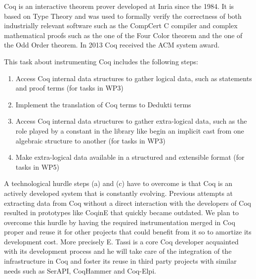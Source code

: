 
Coq is an interactive theorem prover developed at Inria since the 1984.
It is based on Type Theory and was used to formally verify the correctness
of both industrially relevant software such as the CompCert C compiler and
complex mathematical proofs such as the one of the Four Color theorem and the
one of the Odd Order theorem. In 2013 Coq received the ACM system award.

This task about instrumenting Coq includes the following steps:
\begin{enumerate}
\item Access Coq internal data structures to gather logical data, such as
statements and proof terms (for tasks in WP3)
\item Implement the translation of Coq terms to Dedukti terms
\item Access Coq internal data structures to gather extra-logical data,
such as the role played by a constant in the library like begin an implicit
cast from one algebraic structure to another (for tasks in WP3)
\item Make extra-logical data available in a structured and
  extensible format (for tasks in WP5)
\end{enumerate}

A technological hurdle steps (a) and (c) have to overcome is that Coq is an actively
developed system that is constantly evolving. Previous attempts at extracting
data from Coq without a direct interaction with the developers of Coq resulted
in prototypes like CoqinE that quickly became outdated. We plan to overcome
this hurdle by having the required instrumentation merged in Coq proper and
reuse it for other projects that could benefit from it so to amortize its
development cost. More precisely E. Tassi
is a core Coq developer acquainted with its development process and he will take
care of the integration of the infrastructure in Coq and foster its reuse in
third party projects with similar needs such as SerAPI, CoqHammer and Coq-Elpi.

